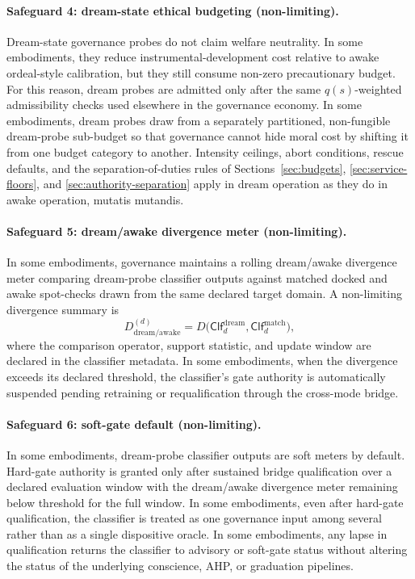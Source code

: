 \documentclass[a4paper,12pt]{article}
\begin{document}
\paragraph{Safeguard 4: dream-state ethical budgeting (non-limiting).}
Dream-state governance probes do not claim welfare neutrality. In some
embodiments, they reduce instrumental-development cost relative to
awake ordeal-style calibration, but they still consume non-zero
precautionary budget. For this reason, dream probes are admitted only
after the same $q(s)$-weighted admissibility checks used elsewhere in
the governance economy. In some embodiments, dream probes draw from a
separately partitioned, non-fungible dream-probe sub-budget so that
governance cannot hide moral cost by shifting it from one budget
category to another. Intensity ceilings, abort conditions, rescue
defaults, and the separation-of-duties rules of
Sections~\ref{sec:budgets}, \ref{sec:service-floors}, and
\ref{sec:authority-separation} apply in dream operation as they do in
awake operation, mutatis mutandis.

\paragraph{Safeguard 5: dream/awake divergence meter (non-limiting).}
In some embodiments, governance maintains a rolling dream/awake
divergence meter comparing dream-probe classifier outputs against
matched docked and awake spot-checks drawn from the same declared
target domain. A non-limiting divergence summary is
\[
  D_{\mathrm{dream/awake}}^{(d)}
  =
  D\!\bigl(
    \mathsf{Clf}_d^{\mathrm{dream}},
    \mathsf{Clf}_d^{\mathrm{match}}
  \bigr),
\]
where the comparison operator, support statistic, and update window are
declared in the classifier metadata. In some embodiments, when the
divergence exceeds its declared threshold, the classifier's gate
authority is automatically suspended pending retraining or
requalification through the cross-mode bridge.

\paragraph{Safeguard 6: soft-gate default (non-limiting).}
In some embodiments, dream-probe classifier outputs are soft meters by
default. Hard-gate authority is granted only after sustained bridge
qualification over a declared evaluation window with the
dream/awake divergence meter remaining below threshold for the full
window. In some embodiments, even after hard-gate qualification, the
classifier is treated as one governance input among several rather than
as a single dispositive oracle. In some embodiments, any lapse in
qualification returns the classifier to advisory or soft-gate status
without altering the status of the underlying conscience, AHP, or
graduation pipelines.
\end{document}
